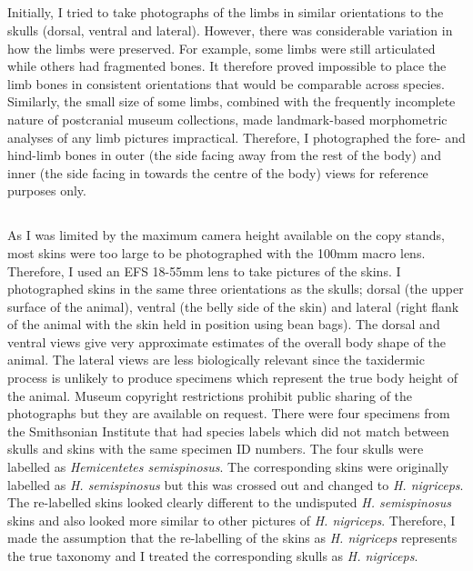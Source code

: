 	\subsection{}
	Initially, I tried to take photographs of the limbs in similar orientations to the skulls (dorsal, ventral and lateral). However, there was considerable variation in how the limbs were preserved. For example, some limbs were still articulated while others had fragmented bones. It therefore proved impossible to place the limb bones in consistent orientations that would be comparable across species. Similarly, the small size of some limbs, combined with the frequently incomplete nature of postcranial museum collections, made landmark-based morphometric analyses of any limb pictures impractical. Therefore, I photographed the fore- and hind-limb bones in outer (the side facing away from the rest of the body) and inner (the side facing in towards the centre of the body) views for reference purposes only.	
	
	\subsection{}
	As I was limited by the maximum camera height available on the copy stands, most skins were too large to be photographed with the 100mm macro lens. Therefore, I used an EFS 18-55mm lens to take pictures of the skins. I photographed skins in the same three orientations as the skulls; dorsal (the upper surface of the animal), ventral (the belly side of the skin) and lateral (right flank of the animal with the skin held in position using bean bags). The dorsal and ventral views give very approximate estimates of the overall body shape of the animal. The lateral views are less biologically relevant since the taxidermic process is unlikely to produce specimens which represent the true body height of the animal. Museum copyright restrictions prohibit public sharing of the photographs but they are available on request.
	There were four specimens from the Smithsonian Institute that had species labels which did not match between skulls and skins with the same specimen ID numbers. The four skulls were labelled as \textit{Hemicentetes semispinosus}. The corresponding skins were originally labelled as \textit{H. semispinosus} but this was crossed out and changed to \textit{H. nigriceps}. The re-labelled skins looked clearly different to the undisputed \textit{H. semispinosus} skins and also looked more similar to other pictures of \textit{H. nigriceps}. Therefore, I made the assumption that the re-labelling of the skins as \textit{H. nigriceps} represents the true taxonomy and I treated the corresponding skulls as \textit{H. nigriceps}.


	

	
